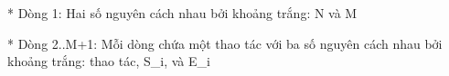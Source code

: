 * Dòng 1: Hai số nguyên cách nhau bởi khoảng trắng: N và M  

   * Dòng 2..M+1: Mỗi dòng chứa một thao tác với ba số nguyên cách nhau bởi khoảng trắng: thao tác, S\_i, và E\_i